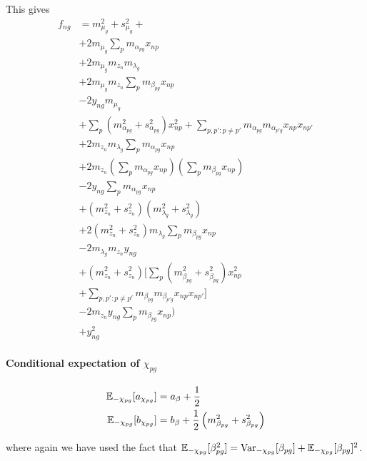 This gives
\begin{equation}
\begin{aligned}
f_{ng}  & =  
m_{\mu_g}^2 + s_{\mu_g}^2 + \\ %
& + 2 m_{\mu_g} \sum_p m_{\alpha_{pg}} x_{np}  \\ %
&  + 2 m_{\mu_g} m_{z_n} m_{\lambda_g} \\ %
& + 2 m_{\mu_g} m_{z_n} \sum_p m_{\beta_{pg}} x_{np} \\ %
& - 2 y_{ng} m_{\mu_g} \\ %
& + \sum_p (m_{\alpha_{pg}}^2 + s_{\alpha_{pg}}^2) x_{np}^2 + \sum_{p,p':p\neq p'} m_{\alpha_{pg}} m_{\alpha_{p'g}} x_{np} x_{np'} \\ %
& + 2 m_{z_n} m_{\lambda_g} \sum_p m_{\alpha_{pg}} x_{np} \\ %
& + 2 m_{z_n} (\sum_p m_{\alpha_{pg}} x_{np})(\sum_p m_{\beta_{pg}} x_{np}) \\ %
& - 2 y_{ng} \sum_p m_{\alpha_{pg}} x_{np} \\ %
& +  (m_{z_n}^2 + s_{z_n}^2) (m_{\lambda_g}^2 + s_{\lambda_g}^2) \\ %
& + 2 (m_{z_n}^2 + s_{z_n}^2) m_{\lambda_g} \sum_p m_{\beta_{pg}} x_{np} \\ %
& -2 m_{\lambda_g} m_{z_n} y_{ng} \\ %
& +(m_{z_n}^2 + s_{z_n}^2) \Big[  \sum_p (m_{\beta_{pg}}^2 + s_{\beta_{pg}}^2) x_{np}^2 \\
& + \sum_{p,p':p\neq p'} m_{\beta_{pg}} m_{\beta_{p'g}} x_{np} x_{np'} \Big] \\ %
& - 2 m_{z_n} y_{ng} \sum_p m_{\beta_{pg}} x_{np} ) \\ %
& + y_{ng}^2  %
\end{aligned}
\end{equation}


\paragraph{Conditional expectation of $\chi_{pg}$}
\begin{equation}
\begin{aligned}
\mathbb{E}_{-\chi_{pg}}[a_{\chi_{pg}}] & = a_\beta + \frac{1}{2} \\
\mathbb{E}_{-\chi_{pg}}[b_{\chi_{pg}}] & = b_\beta + \frac{1}{2}\left(
m_{\beta_{pg}}^2 + s_{\beta_{pg}}^2 \right)
\end{aligned}
\end{equation}

where again we have used the fact that $\mathbb{E}_{-\chi_{pg}}[\beta_{pg}^2] =
\text{Var}_{-\chi_{pg}}[\beta_{pg}] +
\mathbb{E}_{-\chi_{pg}}[\beta_{pg}]^2$.

